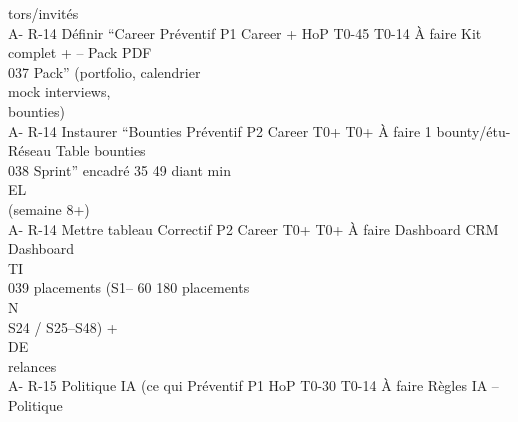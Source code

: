 \documentclass[12pt,landscape,a4paper]{article}
\begin{document}
tors/invités\\
A- R-14     Définir “Career      Préventif P1   Career + HoP T0-45 T0-14 À faire   Kit complet + –            Pack PDF\\
037         Pack” (portfolio,                                                      calendrier\\
mock interviews,\\
bounties)\\
A- R-14     Instaurer “Bounties Préventif P2    Career       T0+ T0+ À faire       1 bounty/étu- Réseau       Table bounties\\
038         Sprint” encadré                                  35    49              diant min\\
\vspace{0.5em}
\vspace{0.5em}
\vspace{0.5em}
\vspace{0.5em}
EL\\
(semaine 8+)\\
A- R-14     Mettre tableau       Correctif P2   Career       T0+ T0+ À faire       Dashboard       CRM        Dashboard\\
\vspace{0.5em}
\vspace{0.5em}
\vspace{0.5em}
\vspace{0.5em}
TI\\
039         placements (S1–                                  60    180             placements\\
\vspace{0.5em}
\vspace{0.5em}
\vspace{0.5em}
\vspace{0.5em}
N\\
S24 / S25–S48) +\\
\vspace{0.5em}
\vspace{0.5em}
\vspace{0.5em}
\vspace{0.5em}
DE\\
relances\\
A- R-15     Politique IA (ce qui Préventif P1   HoP          T0-30 T0-14 À faire   Règles IA       –          Politique\\
\vspace{0.5em}
\vspace{0.5em}
\vspace{0.5em}
\end{document}
